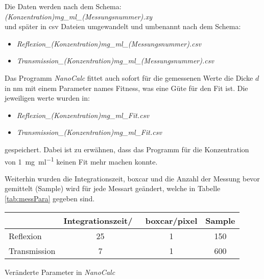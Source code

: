 Die Daten werden nach dem Schema:\\
\textit{(Konzentration)mg\_ml\_(Messungsnummer).xy}\\
und später in csv Dateien umgewandelt und umbenannt nach dem Schema:
\begin{itemize}
	\item \textit{Reflexion\_(Konzentration)mg\_ml\_(Messungsnummer).csv}
	\item \textit{Transmission\_(Konzentration)mg\_ml\_(Messungsnummer).csv}
\end{itemize}

Das Programm \textit{NanoCalc} fittet auch sofort für die gemessenen Werte die Dicke $d$ in \si{\nano\metre} mit einem Parameter names Fitness, was eine Güte für den Fit ist. Die jeweiligen werte wurden in:
\begin{itemize}
	\item \textit{Reflexion\_(Konzentration)mg\_ml\_Fit.csv}
	\item \textit{Transmission\_(Konzentration)mg\_ml\_Fit.csv}
\end{itemize}
gespeichert. Dabei ist zu erwähnen, dass das Programm für die Konzentration von \SI{1}{\milli\gram\per\milli\litre} keinen Fit mehr machen konnte. \bigskip

Weiterhin wurden die Integrationszeit, boxcar und die Anzahl der Messung bevor gemittelt (Sample) wird für jede Messart geändert, welche in Tabelle \ref{tab:messPara} gegeben sind.
\begin{center}
	\captionsetup{type=table}
	\begin{tabular}{l | c c c}
		             & Integrationszeit/\si{\milli\sec} & boxcar/pixel & Sample \\
		\hline
		Reflexion    & 25								   & 1				 & 150    \\
		Transmission & 7								   & 1 				 & 600    
	\end{tabular}
	\caption{Veränderte Parameter in \textit{NanoCalc}}
	\label{tab:messPara}
\end{center} 